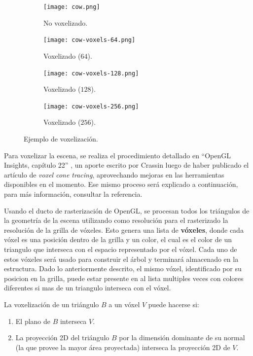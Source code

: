 \begin{figure}[ht]
    \begin{subfigure}{.24\textwidth}
        \centering
        \texttt{[image: cow.png]}
        \caption{No voxelizado.}
    \end{subfigure}
    \begin{subfigure}{.24\textwidth}
        \centering
        \texttt{[image: cow-voxels-64.png]}
        \caption{Voxelizado ($64$).}
    \end{subfigure}
    \begin{subfigure}{.24\textwidth}
        \centering
        \texttt{[image: cow-voxels-128.png]}
        \caption{Voxelizado ($128$).}
    \end{subfigure}
    \begin{subfigure}{.24\textwidth}
        \centering
        \texttt{[image: cow-voxels-256.png]}
        \caption{Voxelizado ($256$).}
    \end{subfigure}
    \caption{Ejemplo de voxelización.}
    \label{fig:voxelized-cow}
\end{figure}

Para voxelizar la escena, se realiza el procedimiento detallado en ``OpenGL Insights, capítulo 22'' \cite{opengl-insights}, un aporte escrito por Crassin luego de haber publicado el artículo de \textit{voxel cone tracing}, aprovechando mejoras en las herramientas disponibles en el momento.
Ese mismo proceso será explicado a continuación, para más información, consultar la referencia.

Usando el ducto de rasterización de OpenGL, se procesan todos los triángulos de la geometría de la escena utilizando como resolución para el rasterizado la resolución de la grilla de vóxeles.
Esto genera una lista de \textbf{vóxeles}, donde cada vóxel es una posición dentro de la grilla y un color, el cual es el color de un triangulo que interseca con el espacio representado por el vóxel.
Cada uno de estos vóxeles será usado para construir el árbol y terminará almacenado en la estructura. Dado lo anteriormente descrito, el mismo vóxel, identificado por su posicion en la grilla, puede estar presente en al lista multiples veces con colores diferentes si mas de un triangulo interseca con el vóxel. 

La voxelización de un triángulo $B$ a un vóxel $V$ puede hacerse si:

\begin{enumerate}
    \item El plano de $B$ interseca $V$.
    \item La proyección 2D del triángulo $B$ por la dimensión dominante de su normal (la que provee la mayor área proyectada) interseca la proyección 2D de $V$.
\end{enumerate}

